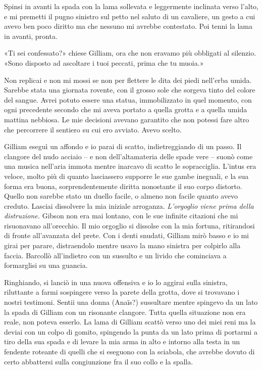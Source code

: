 Spinsi in avanti la spada con la lama sollevata e leggermente inclinata
verso l'alto, e mi premetti il pugno sinistro sul petto nel saluto di un
cavaliere, un gesto a cui avevo ben poco diritto ma che nessuno mi
avrebbe contestato. Poi tenni la lama in avanti, pronta.

«Ti sei confessato?» chiese Gilliam, ora che non eravamo più obbligati
al silenzio. «Sono disposto ad ascoltare i tuoi peccati, prima che tu
muoia.»

Non replicai e non mi mossi se non per flettere le dita dei piedi
nell'erba umida. Sarebbe stata una giornata rovente, con il grosso sole
che sorgeva tinto del colore del sangue. Avrei potuto essere una statua,
immobilizzato in quel momento, con ogni precedente secondo che mi aveva
portato a quella grotta e a quella umida mattina nebbiosa. Le mie
decisioni avevano garantito che non potessi fare altro che percorrere il
sentiero su cui ero avviato. Avevo scelto.

Gilliam eseguì un affondo e io parai di scatto, indietreggiando di un
passo. Il clangore del nudo acciaio -- e non dell'altamateria delle
spade vere -- suonò come una musica nell'aria immota mentre inarcavo di
scatto le sopracciglia. L'intus era veloce, molto più di quanto
lasciassero supporre le sue gambe ineguali, e la sua forma era buona,
sorprendentemente diritta nonostante il suo corpo distorto. Quello non
sarebbe stato un duello facile, o almeno non facile quanto avevo
creduto. Lasciai dissolvere la mia iniziale arroganza. \emph{L'orgoglio
	viene prima della distruzione.} Gibson non era mai lontano, con le sue
infinite citazioni che mi risuonavano all'orecchio. Il mio orgoglio si
dissolse con la mia fortuna, ritirandosi di fronte all'avanzata del
prete. Con i denti snudati, Gilliam mirò basso e io mi girai per parare,
distraendolo mentre usavo la mano sinistra per colpirlo alla faccia.
Barcollò all'indietro con un sussulto e un livido che cominciava a
formarglisi su una guancia.

Ringhiando, si lanciò in una nuova offensiva e io lo aggirai sulla
sinistra, riluttante a farmi sospingere verso la parete della grotta,
dove si trovavano i nostri testimoni. Sentii una donna (Anaïs?)
sussultare mentre spingevo da un lato la spada di Gilliam con un
risonante clangore. Tutta quella situazione non era reale, non poteva
esserlo. La lama di Gilliam scattò verso uno dei miei reni ma la deviai
con un colpo di gomito, spingendo la punta da un lato prima di portarmi
a tiro della sua spada e di levare la mia arma in alto e intorno alla
testa in un fendente roteante di quelli che si eseguono con la sciabola,
che avrebbe dovuto di certo abbattersi sulla congiunzione fra il suo
collo e la spalla.

